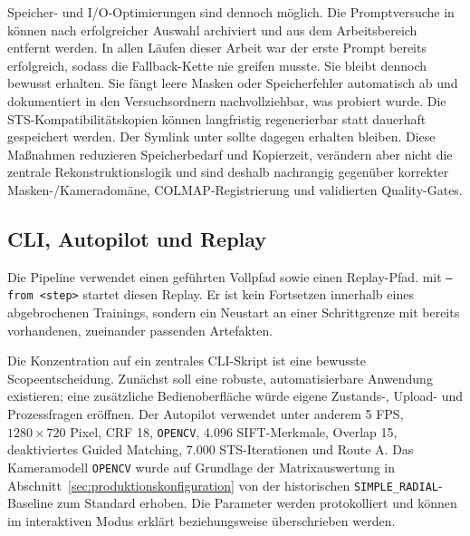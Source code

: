 Speicher- und I/O-Optimierungen sind dennoch möglich. Die Promptversuche in
 können nach erfolgreicher Auswahl archiviert und aus dem
Arbeitsbereich entfernt werden. In allen Läufen dieser Arbeit war der erste
Prompt bereits erfolgreich, sodass die Fallback-Kette nie greifen musste. Sie
bleibt dennoch bewusst erhalten. Sie fängt leere Masken oder Speicherfehler
automatisch ab und dokumentiert in den Versuchsordnern nachvollziehbar, was
probiert wurde. Die STS-Kompatibilitätskopien können langfristig
regenerierbar statt dauerhaft gespeichert werden. Der Symlink unter
 sollte dagegen erhalten bleiben. Diese Maßnahmen
reduzieren Speicherbedarf und Kopierzeit, verändern aber nicht die zentrale
Rekonstruktionslogik und sind deshalb nachrangig gegenüber korrekter
Masken-/Kameradomäne, COLMAP-Registrierung und validierten Quality-Gates.

\subsection{CLI, Autopilot und Replay}

Die Pipeline verwendet einen geführten Vollpfad sowie einen Replay-Pfad.
 mit \texttt{--from <step>} startet diesen Replay. Er
ist kein Fortsetzen innerhalb eines abgebrochenen Trainings, sondern ein
Neustart an einer
Schrittgrenze mit bereits vorhandenen, zueinander passenden Artefakten.

Die Konzentration auf ein zentrales CLI-Skript ist eine bewusste
Scopeentscheidung. Zunächst soll eine robuste, automatisierbare Anwendung
existieren; eine zusätzliche Bedienoberfläche würde eigene Zustands-, Upload-
und Prozessfragen eröffnen. Der Autopilot verwendet unter anderem 5 FPS,
$1280\times720$ Pixel, CRF 18, \texttt{OPENCV}, 4.096 SIFT-Merkmale,
Overlap 15, deaktiviertes Guided Matching, 7.000 STS-Iterationen und Route A.
Das Kameramodell \texttt{OPENCV} wurde auf Grundlage der Matrixauswertung in
Abschnitt~\ref{sec:produktionskonfiguration} von der historischen
\texttt{SIMPLE\_RADIAL}-Baseline zum Standard erhoben. Die Parameter werden
protokolliert und können im interaktiven Modus erklärt beziehungsweise
überschrieben werden.

